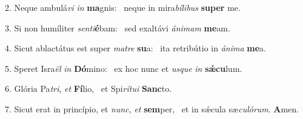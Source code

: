 2. Neque ambulá\textit{vi} \textit{in} \textbf{ma}gnis: \ast\  neque in mira\textit{bí}\textit{li}\textit{bus} \textbf{su}\textbf{per} me.\

3. Si non humíliter \textit{sen}\textit{ti}\textbf{é}bam: \ast\  sed exaltávi \textit{á}\textit{ni}\textit{mam} \textbf{me}am.\

4. Sicut ablactátus est super \textit{ma}\textit{tre} \textbf{su}a: \ast\  ita retribútio in \textit{á}\textit{ni}\textit{ma} \textbf{me}a.\

5. Speret Isra\textit{ël} \textit{in} \textbf{Dó}mino: \ast\  ex hoc nunc et \textit{us}\textit{que} \textit{in} \textbf{sǽ}\textbf{cu}lum.\

6. Glória Pa\textit{tri}, \textit{et} \textbf{Fí}lio, \ast\  et Spi\textit{rí}\textit{tu}\textit{i} \textbf{Sanc}to.\

7. Sicut erat in princípio, et \textit{nunc}, \textit{et} \textbf{sem}per, \ast\  et in sǽcula sæ\textit{cu}\textit{ló}\textit{rum}. \textbf{A}men.\


